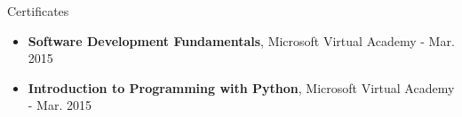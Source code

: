 \documentclass{resume} %
\begin{document}
\begin{rSection}{Certificates}
	
	\begin{itemize}
		\item \textbf{Software Development Fundamentals}, Microsoft Virtual Academy - Mar. 2015
		\item \textbf{Introduction to Programming with Python}, Microsoft Virtual Academy - Mar. 2015
	\end{itemize}
	
\end{rSection}





\end{document}
